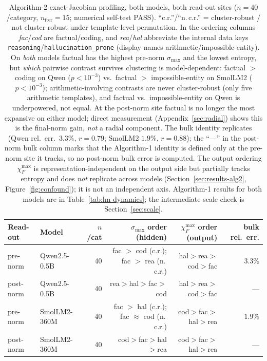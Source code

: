 \documentclass{article}
\begin{document}
\begin{table}[t]\centering\small
\begin{tabular}{llrrrr}
\toprule
Read-out & Model & $n$/cat & $\sigma_{\max}$ order (hidden) & $\chi_F^{\max}$ order (output) & bulk rel.\ err. \\
\midrule
pre-norm  & Qwen2.5-0.5B & 40 & fac $>$ cod (c.r.); fac $>$ rea (n.\,c.r.) & hal$>$rea$>$cod$>$fac & $3.3\%$ \\
post-norm & Qwen2.5-0.5B & 40 & rea$>$hal$>$fac$>$cod & hal$>$rea$>$cod$>$fac & --- \\
pre-norm  & SmolLM2-360M & 40 & fac $>$ hal (c.r.); fac $\approx$ cod (n.\,c.r.) & cod$>$fac$>$hal$>$rea & $1.9\%$ \\
post-norm & SmolLM2-360M & 40 & cod$>$fac$>$hal$>$rea & cod$>$fac$>$hal$>$rea & --- \\
\bottomrule
\end{tabular}
\caption{Algorithm-2 exact-Jacobian profiling, both models, both read-out sites ($n=40$/category,
$n_{\mathrm{iter}}=15$; numerical self-test PASS). ``c.r.''/``n.\,c.r.'' = cluster-robust / not
cluster-robust under template-level permutation. In the ordering columns \emph{fac}/\emph{cod} are
factual/coding, and \emph{rea}/\emph{hal} abbreviate the internal data keys
\texttt{reasoning}/\texttt{hallucination\_prone} (display names arithmetic/impossible-entity). On \emph{both} models factual has the highest
pre-norm $\sigma_{\max}$ and the lowest entropy, but \emph{which} pairwise contrast survives
clustering is model-dependent: factual $>$ coding on Qwen ($p<10^{-3}$) vs.\ factual $>$
impossible-entity on SmolLM2 ($p<10^{-3}$); arithmetic-involving contrasts are never cluster-robust
(only five arithmetic templates), and factual vs.\ impossible-entity on Qwen is underpowered, not
equal. At the post-norm site factual is no longer the most expansive on either model; direct measurement
(Appendix~\ref{sec:radial}) shows this is the final-norm gain, \emph{not} a radial component. The bulk identity replicates (Qwen rel.\ err.\
$3.3\%$, $r=0.79$; SmolLM2 $1.9\%$, $r=0.88$); the ``---'' in the post-norm bulk column marks that the
Algorithm-1 identity is defined only at the pre-norm site it tracks, so no post-norm bulk error is
computed. The output ordering $\chi_F^{\max}$ is
representation-independent on the output side but partially tracks entropy and does \emph{not}
replicate across models (Section~\ref{sec:results-alg2}, Figure~\ref{fig:confound}); it is not an
independent axis. Algorithm-1 results for both models are in Table~\ref{tab:lm-dynamics}; the
intermediate-scale check is Section~\ref{sec:scale}.}
\label{tab:alg2}
\end{table}
\end{document}
